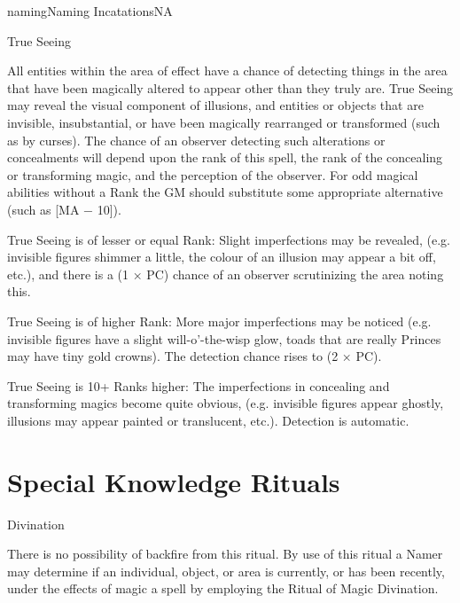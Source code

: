 \begin{College}[2.0]{naming}{Naming Incatations}{NA}
\begin{spell}[S-10]{True Seeing}
\begin{effects}
All entities within the area of effect have a chance of detecting
things in the area that have been magically altered to appear other
than they truly are.  True Seeing may reveal the visual component of
illusions, and entities or objects that are invisible, insubstantial,
or have been magically rearranged or transformed (such as by
curses). The chance of an observer detecting such alterations or
concealments will depend upon the rank of this spell, the rank of the
concealing or transforming magic, and the perception of the
observer. For odd magical abilities without a Rank the GM should
substitute some appropriate alternative (such as [MA − 10]).

True Seeing is of lesser or equal Rank: Slight imperfections may be
revealed, (e.g. invisible figures shimmer a little, the colour of an
illusion may appear a bit off, etc.), and there is a (1 × PC) chance
of an observer scrutinizing the area noting this.

True Seeing is of higher Rank: More major imperfections may be noticed
(e.g. invisible figures have a slight will-o’-the-wisp glow, toads
that are really Princes may have tiny gold crowns).  The detection
chance rises to (2 × PC).

True Seeing is 10+ Ranks higher: The imperfections in concealing and
transforming magics become quite obvious, (e.g.  invisible figures
appear ghostly, illusions may appear painted or translucent,
etc.). Detection is automatic.
\end{effects}
\end{spell}

\section{Special Knowledge Rituals}

\begin{ritual}[R-1]{Divination}

\begin{effects}
There is no possibility of backfire from this ritual.  By use of this
ritual a Namer may determine if an individual, object, or area is
currently, or has been recently, under the effects of magic a spell by
employing the Ritual of Magic Divination.


\end{effects}
\end{ritual}
\end{College}

